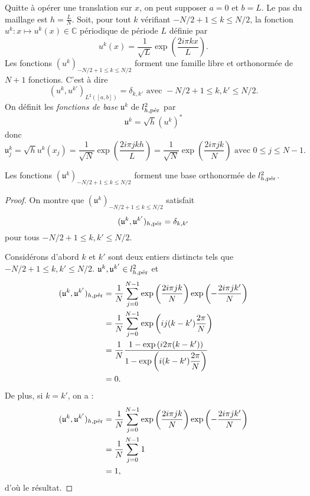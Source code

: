 Quitte à opérer une translation sur $x$, on peut supposer $a=0$ et $b=L$. Le pas du maillage est $h = \frac{L}{N}$.
Soit, pour tout $k$ vérifiant $-N/2+1 \leq k \leq N/2$, la fonction $u^k : x \mapsto u^k(x) \in \mathbb{C}$ périodique de période $L$ définie par 
\begin{equation}
u^k(x) = \dfrac{1}{\sqrt{L}} \exp \left( \dfrac{2 i \pi k x}{L} \right).
\end{equation}
Les fonctions $(u^k)_{-N/2 +1 \leq k \leq N/2}$ forment une famille libre et orthonormée de $N+1$ fonctions. C'est à dire
\begin{equation}
(u^k, u^{k'})_{L^2([a,b])} = \delta_{k,k'} \text{ avec } -N/2+1 \leq k, k' \leq N/2.
\end{equation}
On définit les \textit{fonctions de base} $\mathfrak{u}^k$ de $l^2_{h,\per}$ par
\begin{equation}
\mathfrak{u}^k = \sqrt{h} (u^k)^*
\end{equation}
donc 
\begin{equation}
\mathfrak{u}^k_j = \sqrt{h}  u^k(x_j) = \dfrac{1}{\sqrt{N}} \exp \left( \dfrac{2 i \pi j k h}{L} \right) = \dfrac{1}{\sqrt{N}} \exp \left( \dfrac{2 i \pi j k}{N} \right) \text{ avec } 0 \leq j \leq N-1.
\label{eq:base_fourier_disc}
\end{equation}


\begin{proposition}
Les fonctions $(\mathfrak{u}^k)_{-N/2+1 \leq k \leq N/2}$ forment une base orthonormée de $l^2_{h,\per}$.
\end{proposition}

\begin{proof}
On montre que $(\mathfrak{u}^k)_{-N/2+1 \leq k \leq N/2}$ satisfait
\begin{equation}
(\mathfrak{u}^k, \mathfrak{u}^{k'})_{h,\per} = \delta_{k,k'}
\end{equation}
pour tous $-N/2+1 \leq k, k' \leq N/2$.

Considérons d'abord $k$ et $k'$ sont deux entiers distincts tels que $-N/2+1 \leq k, k' \leq N/2$. $\mathfrak{u}^k, \mathfrak{u}^{k'} \in l^2_{h,\per}$ et
\begin{align*}
(\mathfrak{u}^k, \mathfrak{u}^{k'})_{h,\per} & = \dfrac{1}{N} \gsum_{j=0}^{N-1} \exp \left( \dfrac{2 i \pi j k}{N} \right) \exp \left( -\dfrac{2 i \pi j k'}{N} \right) \\
		& = \dfrac{1}{N} \gsum_{j=0}^{N-1} \exp \left( i j (k-k') \dfrac{2 \pi}{N} \right)\\
		& = \dfrac{1}{N} \dfrac{1 - \exp \left( i 2 \pi (k-k') \right)}{1 - \exp \left( i (k-k') \dfrac{2 \pi}{N}  \right)} \\
		& = 0.
\end{align*}
De plus, si $k=k'$, on a :
\begin{align*}
(\mathfrak{u}^k, \mathfrak{u}^{k'})_{h,\per} & = \dfrac{1}{N} \gsum_{j=0}^{N-1} \exp \left( \dfrac{2 i \pi j k}{N} \right) \exp \left( -\dfrac{2 i \pi j k'}{N} \right) \\
		& = \dfrac{1}{N} \gsum_{j=0}^{N-1} 1 \\
		& = 1,
\end{align*}
d'où le résultat.
\end{proof}

